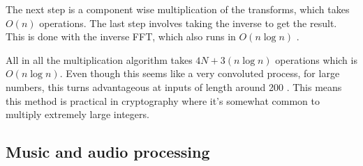The next step is a component wise multiplication of the transforms, which takes $O(n)$ operations. The last step involves taking the inverse to get the result. This is done with the inverse FFT, which also runs in $O(n \log n)$ \cite{Reducible2020}.

All in all the multiplication algorithm takes $4N + 3(n \log n)$ operations which is $O(n \log n)$. Even though this seems like a very convoluted process, for large numbers, this turns advantageous at inputs of length around 200 \cite{Emerencia2007}. This means this method is practical in cryptography where it's somewhat common to multiply extremely large integers. 



\subsection{Music and audio processing}